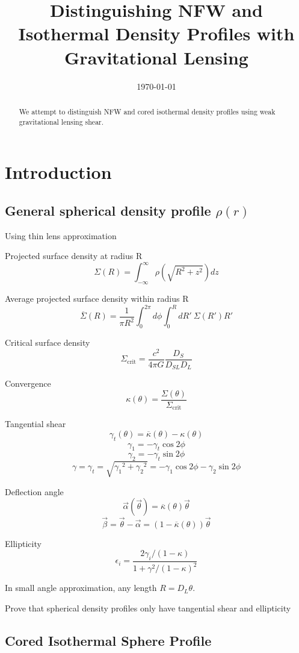 \documentclass[]{article}
\begin{document}
\title{Distinguishing NFW and Isothermal Density Profiles with Gravitational Lensing}
\author{}
\date{\today}
\maketitle

\begin{abstract}
We attempt to distinguish NFW and cored isothermal density profiles using weak gravitational lensing shear.
\end{abstract}

\section{Introduction}

\subsection{General spherical density profile $\rho(r)$}
Using thin lens approximation

Projected surface density at radius R
\[\Sigma(R) = \int_{-\infty}^{\infty}{\rho(\sqrt{R^2 + z^2}) dz}\]

Average projected surface density within radius R
\[\overline{\Sigma}(R) = \frac{1}{\pi R^2} \int_0^{2\pi}{d\phi \int_0^{R}{dR'~\Sigma(R')R'}}\]

Critical surface density
\[\Sigma_\mathrm{crit} = \frac{c^2}{4\pi G} \frac{D_S}{D_{SL} D_L}\]

Convergence
\[\kappa(\theta) = \frac{\Sigma(\theta)}{\Sigma_\mathrm{crit}}\]

Tangential shear
\[\gamma_t(\theta) = \overline{\kappa}(\theta) - \kappa(\theta)\]
\[\gamma_1 = -\gamma_t \cos{2\phi}\]
\[\gamma_2 = -\gamma_t \sin{2\phi}\]
\[\gamma = \gamma_t = \sqrt{{\gamma_1}^2 + {\gamma_2}^2} = -\gamma_1 \cos{2\phi} -\gamma_2 \sin{2\phi}\]

Deflection angle
\[\vec{\alpha}(\vec{\theta}) = \overline{\kappa}(\theta)\vec{\theta}\]
\[\vec{\beta} = \vec{\theta} - \vec{\alpha} = (1 - \overline{\kappa}(\theta))\vec{\theta} \]

Ellipticity
\[\epsilon_i = \frac{2 \gamma_i/(1 - \kappa)}{1 + \gamma^2/(1 - \kappa)^2}\]

In small angle approximation, any length $R = D_L \theta$.

Prove that spherical density profiles only have tangential shear and ellipticity


\subsection{Cored Isothermal Sphere Profile}
\end{document}
